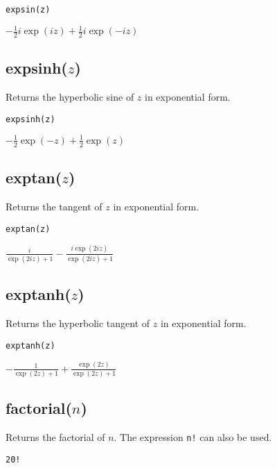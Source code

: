 \documentclass[12pt]{article}
\begin{document}
{\color{blue}
\begin{verbatim}
expsin(z)
\end{verbatim}
}

\noindent
$\displaystyle -\tfrac{1}{2}i\exp(iz)+\tfrac{1}{2}i\exp(-iz)$

\subsection*{expsinh($z$)}

Returns the hyperbolic sine of $z$ in exponential form.

{\color{blue}
\begin{verbatim}
expsinh(z)
\end{verbatim}
}

\noindent
$\displaystyle -\tfrac{1}{2}\exp(-z)+\tfrac{1}{2}\exp(z)$

\subsection*{exptan($z$)}

Returns the tangent of $z$ in exponential form.

{\color{blue}
\begin{verbatim}
exptan(z)
\end{verbatim}
}

\noindent
$\displaystyle \frac{i}{\exp(2iz)+1}-\frac{i\exp(2iz)}{\exp(2iz)+1}$

\subsection*{exptanh($z$)}

Returns the hyperbolic tangent of $z$ in exponential form.

{\color{blue}
\begin{verbatim}
exptanh(z)
\end{verbatim}
}

\noindent
$\displaystyle -\frac{1}{\exp(2z)+1}+\frac{\exp(2z)}{\exp(2z)+1}$

\subsection*{factorial($n$)}

Returns the factorial of $n$.
The expression {\tt n!} can also be used.

{\color{blue}
\begin{verbatim}
20!
\end{verbatim}
}
\end{document}

